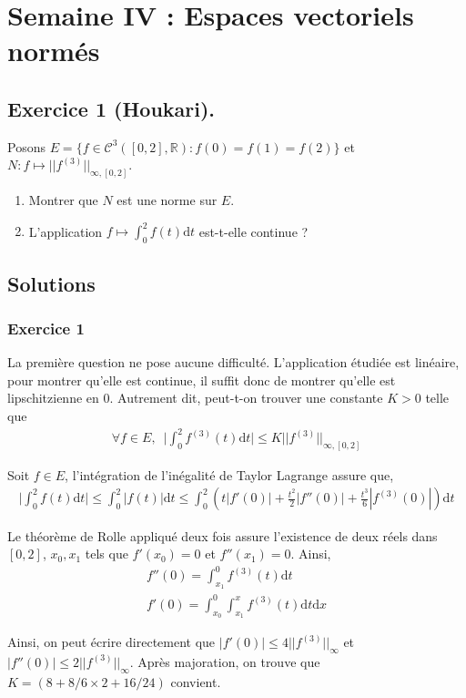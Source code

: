 \documentclass{article}
\begin{document}
\section{Semaine IV : Espaces vectoriels normés}
\subsection*{Exercice 1 (Houkari).}
Posons $E = \{f \in \mathcal{C}^{3}([0, 2], \mathbb{R}) : f(0) = f(1) = f(2)\}$ et $N : f \mapsto ||f^{(3)}||_{\infty, [0,2]}$. \begin{enumerate}
	\item Montrer que $N$ est une norme sur $E$.
	\item L'application $\displaystyle f\mapsto \int_{0}^2 f(t)\mathrm{d}t$ est-t-elle continue ?
\end{enumerate}
\subsection*{Solutions}
\subsubsection*{Exercice 1}
La première question ne pose aucune difficulté. L'application étudiée est linéaire, pour montrer qu'elle est continue, il suffit donc de montrer qu'elle est lipschitzienne en $0$. Autrement dit, peut-t-on trouver une constante $K>0$ telle que 
\begin{align*}
	\forall f \in E, \,\,\, \bigg|\int_{0}^2 f^{(3)}(t)\mathrm{d}t\bigg|\leq K ||f^{(3)}||_{\infty, [0,2]}
\end{align*}

Soit $f \in E$, l'intégration de l'inégalité de Taylor Lagrange assure que, 
\begin{align*}
	\bigg|\int_{0}^2 f(t)\mathrm{d}t\bigg|\leq \int_{0}^2 |f(t)|\mathrm{d}t\leq \int_{0}^2 (t|f'(0)| + \frac{t^2}{2}|f''(0)|+\frac{t^3}{6}|f^{(3)}(0)|)\mathrm{d}t
\end{align*}

Le théorème de Rolle appliqué deux fois assure l'existence de deux réels dans $[0, 2]$, $x_0, x_1$ tels que $f'(x_0) = 0$ et $f''(x_1) = 0$. Ainsi, 
\begin{align*}
	f''(0) = \int_{x_1}^{0}f^{(3)}(t)\mathrm{d}t\\
	f'(0) = \int_{x_0}^{0} \int_{x_1}^{x}f^{(3)}(t)\mathrm{d}t \mathrm{d}x
\end{align*}

Ainsi, on peut écrire directement que $|f'(0)| \leq 4||f^{(3)}||_{\infty}$ et $|f''(0)|\leq 2||f^{(3)}||_{\infty}$. Après majoration, on trouve que $K = (8+8/6\times 2+16/24)$ convient.
\end{document}
